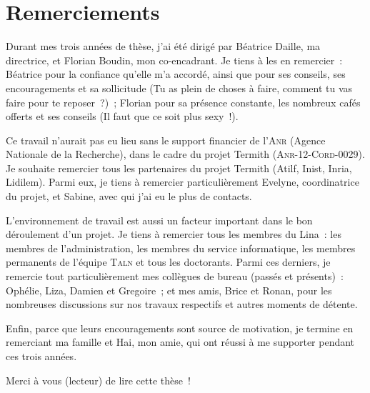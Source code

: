 \chapter*{Remerciements}
\label{chap:main-acknowledgment}
  Durant mes trois années de thèse, j'ai été dirigé par Béatrice Daille, ma
  directrice, et Florian Boudin, mon co-encadrant. Je tiens à les en remercier~:
  Béatrice pour la confiance qu'elle m'a accordé, ainsi que pour ses conseils,
  ses encouragements et sa sollicitude (\og{}Tu as plein de choses à faire,
  comment tu vas faire pour te reposer~?\fg{})~; Florian pour sa présence
  constante, les nombreux cafés offerts et ses conseils (\og{}Il faut que ce
  soit plus sexy~!\fg{}).

  Ce travail n'aurait pas eu lieu sans le support financier de l'\textsc{Anr}
  (Agence Nationale de la Recherche), dans le cadre du projet Termith
  (\textsc{Anr}-12-\textsc{Cord}-0029). Je souhaite remercier tous les
  partenaires du projet Termith (Atilf, Inist, Inria, Lidilem). Parmi eux, je
  tiens à remercier particulièrement Evelyne, coordinatrice du projet, et
  Sabine, avec qui j'ai eu le plus de contacts.

  L'environnement de travail est aussi un facteur important dans le bon
  déroulement d'un projet. Je tiens à remercier tous les membres du Lina~:
  les membres de l'administration, les membres du service informatique, les
  membres permanents de l'équipe \textsc{Taln} et tous les doctorants. Parmi ces
  derniers, je remercie tout particulièrement mes collègues de bureau (passés et
  présents)~: Ophélie, Liza, Damien et Gregoire~; et mes amis, Brice et Ronan,
  pour les nombreuses discussions sur nos travaux respectifs et autres moments
  de détente.

  Enfin, parce que leurs encouragements sont source de motivation, je termine en
  remerciant ma famille et Hai, mon amie, qui ont réussi à me supporter pendant
  ces trois années.

  \vfill{}\hfill{}Merci à vous (lecteur) de lire cette thèse~!

